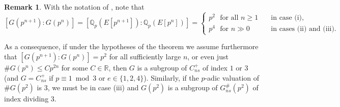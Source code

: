 \documentclass{amsart}
\newcommand{\Qp}{\mathbb{Q}_p}
\theoremstyle{definition}
\newtheorem{remark}[theorem]{Remark}
\numberwithin{theorem}{section}
\numberwithin{equation}{section}
\begin{document}
\begin{remark}\label{rmk: if G grows quadratically it is a nonsplit Cartan}
With the notation of , note that
\[
[G(p^{n+1}):G(p^n)]=[\Qp(E[p^{n+1}]):\Qp(E[p^n])] = \begin{cases}
    p^2 \,\, \text{ for all } n \geq 1 & \quad \text{in case (i)}, \\
    p^4 \,\, \text{ for } n\gg 0 & \quad \text{in cases (ii) and (iii).}
\end{cases}
\]

\noindent As a consequence, if under the hypotheses of the theorem we assume furthermore that $[G(p^{n+1}) : G(p^n)] = p^2$ for all sufficiently large $n$, or even just $\#G(p^{n}) \leq Cp^{2n}$ for some $C \in \mathbb{R}$, then $G$ is a subgroup of $C_{ns}^+$ of index $1$ or $3$ (and $G=C_{ns}^+$ if $p \equiv 1 \bmod 3$ or $e \in \{1,2,4\}$). Similarly, if the $p$-adic valuation of $\#G(p^2)$ is $3$, we must be in case (iii) and $G(p^2)$ is a subgroup of $G_{ns}^\#(p^2)$ of index dividing $3$.
\end{remark}
\end{document}
